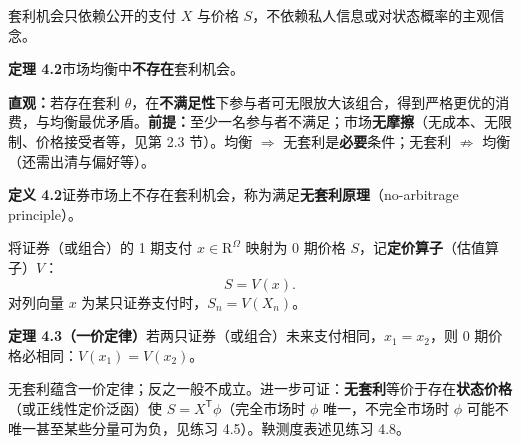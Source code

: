 \begin{tcolorbox}[knowledge,title=4.3 无套利原理]
套利机会只依赖公开的支付 $X$ 与价格 $S$，不依赖私人信息或对状态概率的主观信念。

\begin{tcolorbox}[knowledge]
\textbf{定理 4.2}\quad 市场均衡中\textbf{不存在}套利机会。
\end{tcolorbox}

\textbf{直观：}若存在套利 $\theta$，在\textbf{不满足性}下参与者可无限放大该组合，得到严格更优的消费，与均衡最优矛盾。\textbf{前提：}至少一名参与者不满足；市场\textbf{无摩擦}（无成本、无限制、价格接受者等，见第 2.3 节）。均衡 $\Rightarrow$ 无套利是\textbf{必要}条件；无套利 $\not\Rightarrow$ 均衡（还需出清与偏好等）。

\begin{tcolorbox}[knowledge]
\textbf{定义 4.2}\quad 证券市场上不存在套利机会，称为满足\textbf{无套利原理}（no-arbitrage principle）。
\end{tcolorbox}
\end{tcolorbox}

\begin{tcolorbox}[knowledge,title=4.4 资产定价基本定理（开端）]
将证券（或组合）的 1 期支付 $x\in\mathrm{R}^{\Omega}$ 映射为 0 期价格 $S$，记\textbf{定价算子}（估值算子）$V$：
\[
    S=V(x).
    \tag{4.1}
\]
对列向量 $x$ 为某只证券支付时，$S_n=V(X_n)$。

\begin{tcolorbox}[knowledge]
\textbf{定理 4.3（一价定律）}\quad 若两只证券（或组合）未来支付相同，$x_1=x_2$，则 0 期价格必相同：$V(x_1)=V(x_2)$。
\end{tcolorbox}

无套利蕴含一价定律；反之一般不成立。进一步可证：\textbf{无套利}等价于存在\textbf{状态价格}（或正线性定价泛函）使 $S=X^{\mathsf T}\phi$（完全市场时 $\phi$ 唯一，不完全市场时 $\phi$ 可能不唯一甚至某些分量可为负，见练习 4.5）。鞅测度表述见练习 4.8。
\end{tcolorbox}
\fi


